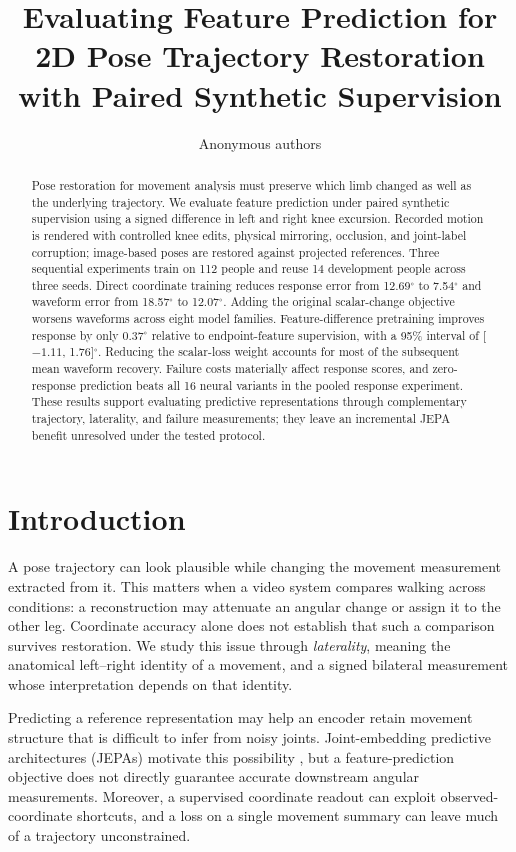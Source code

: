 \documentclass{article}
\title{Evaluating Feature Prediction for 2D Pose Trajectory Restoration with Paired Synthetic Supervision}
\author{Anonymous authors}
\newcommand{\degunit}{^{\circ}}
\begin{document}
\maketitle
\begin{abstract}
Pose restoration for movement analysis must preserve which limb changed as well as the underlying trajectory. We evaluate feature prediction under paired synthetic supervision using a signed difference in left and right knee excursion. Recorded motion is rendered with controlled knee edits, physical mirroring, occlusion, and joint-label corruption; image-based poses are restored against projected references. Three sequential experiments train on 112 people and reuse 14 development people across three seeds. Direct coordinate training reduces response error from 12.69$\degunit$ to 7.54$\degunit$ and waveform error from 18.57$\degunit$ to 12.07$\degunit$. Adding the original scalar-change objective worsens waveforms across eight model families. Feature-difference pretraining improves response by only 0.37$\degunit$ relative to endpoint-feature supervision, with a 95\% interval of [$-1.11$, 1.76]$\degunit$. Reducing the scalar-loss weight accounts for most of the subsequent mean waveform recovery. Failure costs materially affect response scores, and zero-response prediction beats all 16 neural variants in the pooled response experiment. These results support evaluating predictive representations through complementary trajectory, laterality, and failure measurements; they leave an incremental JEPA benefit unresolved under the tested protocol.
\end{abstract}

\section{Introduction}
A pose trajectory can look plausible while changing the movement measurement extracted from it. This matters when a video system compares walking across conditions: a reconstruction may attenuate an angular change or assign it to the other leg. Coordinate accuracy alone does not establish that such a comparison survives restoration. We study this issue through \emph{laterality}, meaning the anatomical left--right identity of a movement, and a signed bilateral measurement whose interpretation depends on that identity.

Predicting a reference representation may help an encoder retain movement structure that is difficult to infer from noisy joints. Joint-embedding predictive architectures (JEPAs) motivate this possibility \citep{assran2023ijepa,bardes2024vjepa}, but a feature-prediction objective does not directly guarantee accurate downstream angular measurements. Moreover, a supervised coordinate readout can exploit observed-coordinate shortcuts, and a loss on a single movement summary can leave much of a trajectory unconstrained.
\end{document}
